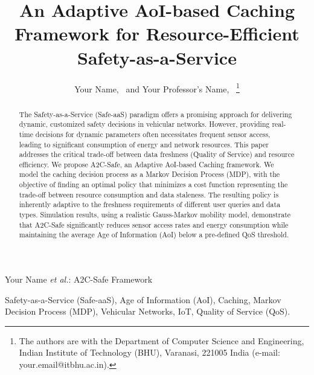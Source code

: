 \documentclass[journal]{IEEEtran}
\begin{document}
\title{An Adaptive AoI-based Caching Framework for Resource-Efficient Safety-as-a-Service}

\author{Your Name,~
        and Your Professor's Name,~%
\thanks{The authors are with the Department of Computer Science and Engineering, Indian Institute of Technology (BHU), Varanasi, 221005 India (e-mail: your.email@itbhu.ac.in).}}

%
{Your Name \MakeLowercase{\textit{et al.}}: A2C-Safe Framework}

\maketitle

\begin{abstract}
The Safety-as-a-Service (Safe-aaS) paradigm offers a promising approach for delivering dynamic, customized safety decisions in vehicular networks. However, providing real-time decisions for dynamic parameters often necessitates frequent sensor access, leading to significant consumption of energy and network resources. This paper addresses the critical trade-off between data freshness (Quality of Service) and resource efficiency. We propose A2C-Safe, an Adaptive AoI-based Caching framework. We model the caching decision process as a Markov Decision Process (MDP), with the objective of finding an optimal policy that minimizes a cost function representing the trade-off between resource consumption and data staleness. The resulting policy is inherently adaptive to the freshness requirements of different user queries and data types. Simulation results, using a realistic Gauss-Markov mobility model, demonstrate that A2C-Safe significantly reduces sensor access rates and energy consumption while maintaining the average Age of Information (AoI) below a pre-defined QoS threshold.
\end{abstract}

\begin{IEEEkeywords}
Safety-as-a-Service (Safe-aaS), Age of Information (AoI), Caching, Markov Decision Process (MDP), Vehicular Networks, IoT, Quality of Service (QoS).
\end{IEEEkeywords}
\end{document}
